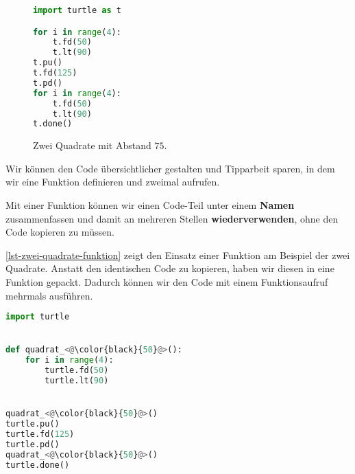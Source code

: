 \begin{figure}[htb]
\centering
\begin{minipage}[c][4cm]{0.5\linewidth}
\centering
{}
\caption{Zwei Quadrate mit Abstand $75$.}
\label{figure-zwei-quadrate}
\end{minipage}
\hfill
\begin{minipage}[c]{0.4\linewidth}
\centering
\begin{lstlisting}[language=python, caption={Zwei \lstinline{for}-Schleifen nacheinander (\graybgtexttt{zwei\_quadrate.py}).}, label=lst-zwei-quadrate]
import turtle as t

for i in range(4):
    t.fd(50)
    t.lt(90)
t.pu()
t.fd(125)
t.pd()
for i in range(4):
    t.fd(50)
    t.lt(90)
t.done()
\end{lstlisting}
\end{minipage}
\end{figure}

Wir können den Code übersichtlicher gestalten und Tipparbeit sparen, in dem wir eine Funktion definieren und zweimal aufrufen.

\begin{definition}[Funktion]
Mit einer Funktion können wir einen Code-Teil unter einem \textbf{Namen} zusammenfassen und damit an mehreren Stellen \textbf{wiederverwenden}, ohne den Code kopieren zu müssen.
\end{definition}

\autoref{lst-zwei-quadrate-funktion} zeigt den Einsatz einer Funktion am Beispiel der zwei Quadrate. Anstatt den identischen Code zu kopieren, haben wir diesen in eine Funktion gepackt. Dadurch können wir den Code mit einem Funktionsaufruf mehrmals ausführen.

\begin{lstlisting}[language=python, caption={Eine eigene Funktion mit zwei Funktionsaufrufen (\graybgtexttt{zwei\_quadrate.py}).}, label={lst-zwei-quadrate-funktion}]
import turtle


def quadrat_<@\color{black}{50}@>():
    for i in range(4):
        turtle.fd(50)
        turtle.lt(90)


quadrat_<@\color{black}{50}@>()
turtle.pu()
turtle.fd(125)
turtle.pd()
quadrat_<@\color{black}{50}@>()
turtle.done()
\end{lstlisting}

